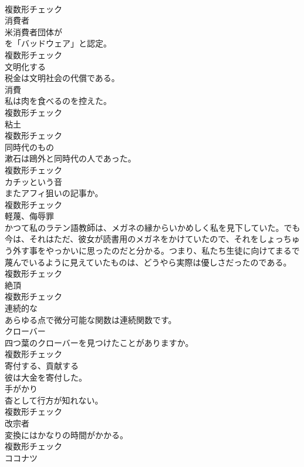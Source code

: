 \documentclass[8pt]{extreport}
\begin{document}
\begin{CJK}{UTF8}{min}
\\	複数形チェック
\\	[名詞]	消費者	
\\	米消費者団体が
\\	を「バッドウェア」と認定。	
\\	複数形チェック
\\	[動詞]	文明化する	
\\	税金は文明社会の代償である。	
\\	[名詞]	消費	
\\	私は肉を食べるのを控えた。	
\\	複数形チェック
\\	[名詞]	粘土	
\\	複数形チェック
\\	[名詞]	同時代のもの	
\\	漱石は鴎外と同時代の人であった。	
\\	複数形チェック
\\	[名詞]	カチッという音	
\\	またアフィ狙いの記事か。	
\\	複数形チェック
\\	[名詞]	軽蔑、侮辱罪	
\\	かつて私のラテン語教師は、メガネの縁からいかめしく私を見下していた。でも今は、それはただ、彼女が読書用のメガネをかけていたので、それをしょっちゅう外す事をやっかいに思ったのだと分かる。つまり、私たち生徒に向けてまるで蔑んでいるように見えていたものは、どうやら実際は優しさだったのである。	
\\	複数形チェック
\\	[名詞]	絶頂	
\\	複数形チェック
\\	[形容詞]	連続的な	
\\	あらゆる点で微分可能な関数は連続関数です。	
\\	[名詞]	クローバー	
\\	四つ葉のクローバーを見つけたことがありますか。	
\\	複数形チェック
\\	[動詞]	寄付する、貢献する	
\\	彼は大金を寄付した。	
\\	[名詞]	手がかり	
\\	杳として行方が知れない。	
\\	複数形チェック
\\	[名詞]	改宗者	
\\	変換にはかなりの時間がかかる。	
\\	複数形チェック
\\	[名詞]	ココナツ	

\end{CJK}
\end{document}
